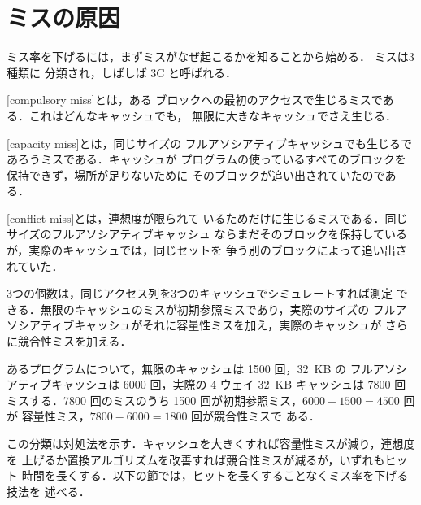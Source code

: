 \documentclass[../main.tex]{subfiles}
\begin{document}
\section{ミスの原因}
\label{sec:l14-three-cs}

ミス率を下げるには，まずミスがなぜ起こるかを知ることから始める．
ミスは3種類に
分類され，しばしば 3C と呼ばれる．

\begin{definition}
  [compulsory miss]とは，ある
  ブロックへの最初のアクセスで生じるミスである．これはどんなキャッシュでも，
  無限に大きなキャッシュでさえ生じる．

  [capacity miss]とは，同じサイズの
  フルアソシアティブキャッシュでも生じるであろうミスである．キャッシュが
  プログラムの使っているすべてのブロックを保持できず，場所が足りないために
  そのブロックが追い出されていたのである．

  [conflict miss]とは，連想度が限られて
  いるためだけに生じるミスである．同じサイズのフルアソシアティブキャッシュ
  ならまだそのブロックを保持しているが，実際のキャッシュでは，同じセットを
  争う別のブロックによって追い出されていた．
\end{definition}

3つの個数は，同じアクセス列を3つのキャッシュでシミュレートすれば測定
できる．無限のキャッシュのミスが初期参照ミスであり，実際のサイズの
フルアソシアティブキャッシュがそれに容量性ミスを加え，実際のキャッシュが
さらに競合性ミスを加える．

\begin{example}
  \label{ex:l14-three-cs}
  あるプログラムについて，無限のキャッシュは \num{1500} 回，32~KB の
  フルアソシアティブキャッシュは \num{6000} 回，実際の 4 ウェイ 32~KB
  キャッシュは \num{7800} 回ミスする．\num{7800} 回のミスのうち
  \num{1500} 回が初期参照ミス，$\num{6000} - \num{1500} = \num{4500}$ 回が
  容量性ミス，$\num{7800} - \num{6000} = \num{1800}$ 回が競合性ミスで
  ある．
\end{example}

この分類は対処法を示す．キャッシュを大きくすれば容量性ミスが減り，連想度を
上げるか置換アルゴリズムを改善すれば競合性ミスが減るが，いずれもヒット
時間を長くする．以下の節では，ヒットを長くすることなくミス率を下げる技法を
述べる．
\end{document}
